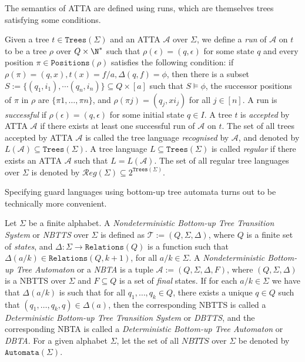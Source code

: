 \documentclass[12pt, a4paper]{article}
\newcommand{\reg}{\mathcal{R}eg}
\newcommand{\T}{\mathcal{T}}
\newcommand{\tsig}{\Trees{\Alphabet}}
\newcommand{\Alphabet}{\ensuremath{\Sigma}}
\newcommand{\Trees}[1]{\ensuremath{\texttt{Trees}\left(#1\right)}}
\newcommand{\Positions}{\texttt{Positions}}
\newcommand{\Transitions}{\ensuremath{\Delta}}
\newcommand{\Relations}{\texttt{Relations}}
\newcommand{\automaton}{\ensuremath{\mathcal{A}}}
\newcommand{\Automata}[1]{\texttt{Automata}(#1)}
\begin{document}
The semantics of ATTA are defined using runs, which are themselves trees satisfying some conditions.
\begin{definition}\label{def:acceptanceByAtta}
    Given a tree $t \in \tsig$ and an ATTA $\automaton$ over $\Alphabet$, we define a \emph{run} of $\automaton$ on $t$ to be a tree $\rho$ over $Q \times \N^*$ such that $\rho(\epsilon) = (q, \epsilon)$ for some state $q$ and every position $\pi \in \Positions(\rho)$ satisfies the following condition: if $\rho(\pi) = (q, x), t(x) = f/a, \Transitions(q ,f) = \phi$, then there is a subset $S := \{(q_1, i_1), \dotsm (q_n, i_n)\} \subseteq Q \times [a]$ such that $S \models \phi$, the successor positions of $\pi$ in $\rho$ are $\{\pi 1, \dots, \pi n\}$, and $\rho(\pi j) = (q_j, xi_j)$ for all $j \in [n]$. A run is \emph{successful} if $\rho(\epsilon) = (q, \epsilon)$ for some initial state $q \in I$. A tree $t$ is \emph{accepted} by ATTA $\automaton$ if there exists at least one successful run of $\automaton$ on $t$. The set of all trees accepted by ATTA $\automaton$ is called the tree language \emph{recognised} by $\automaton$, and denoted by $L(\automaton) \subseteq \tsig$. A tree language $L \subseteq \tsig$ is called \emph{regular} if there exists an ATTA $\automaton$ such that $L = L(\automaton)$. The set of all regular tree languages over $\Alphabet$ is denoted by $\reg(\Alphabet) \subseteq 2^{\tsig}$.
\end{definition}

Specifying guard languages using bottom-up tree automata turns out to be technically more convenient.
\begin{definition}\label{def:nbtts}
    Let $\Alphabet$ be a finite alphabet. A \emph{Nondeterministic Bottom-up Tree Transition System} or \emph{NBTTS} over $\Alphabet$ is defined as $\T := (Q, \Alphabet, \Transitions)$, where $Q$ is a finite set of \emph{states}, and $\Transitions : \Alphabet \to \Relations(Q)$ is a function such that $\Transitions(a/k) \in \Relations(Q, k+1)$, for all $a/k \in \Alphabet$. A \emph{Nondeterministic Bottom-up Tree Automaton} or a \emph{NBTA} is a tuple $\automaton := (Q, \Alphabet, \Transitions, F)$, where $(Q, \Alphabet, \Transitions)$ is a NBTTS over $\Alphabet$ and $F \subseteq Q$ is a set of \emph{final} states. If for each $a/k \in \Alphabet$ we have that $\Transitions(a/k)$ is such that for all $q_1, \dots, q_k \in Q$, there exists a unique $q \in Q$ such that $(q_1, \dots, q_k, q) \in \Transitions(a)$, then the corresponding NBTTS is called a \emph{Deterministic Bottom-up Tree Transition System} or \emph{DBTTS}, and the corresponding NBTA is called a \emph{Deterministic Bottom-up Tree Automaton} or \emph{DBTA}. For a given alphabet $\Alphabet$, let the set of all $NBTTS$ over $\Alphabet$ be denoted by $\Automata{\Alphabet}$.
\end{definition}
\end{document}
